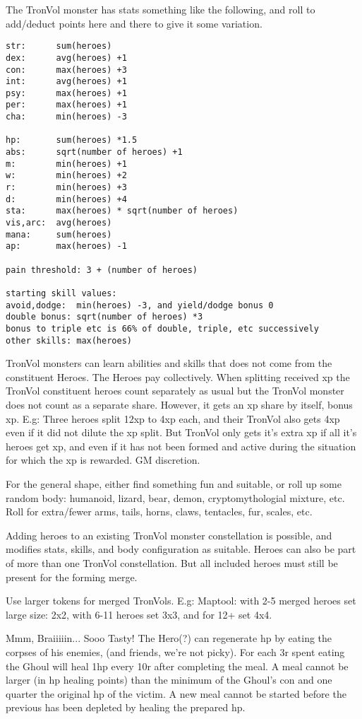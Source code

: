 The TronVol monster has stats something like the following, and roll to add/deduct points here and there to give it some variation.
\small\begin{verbatim}
str:      sum(heroes)
dex:      avg(heroes) +1
con:      max(heroes) +3
int:      avg(heroes) +1
psy:      max(heroes) +1
per:      max(heroes) +1
cha:      min(heroes) -3

hp:       sum(heroes) *1.5
abs:      sqrt(number of heroes) +1
m:        min(heroes) +1
w:        min(heroes) +2
r:        min(heroes) +3
d:        min(heroes) +4
sta:      max(heroes) * sqrt(number of heroes)
vis,arc:  avg(heroes)
mana:     sum(heroes)
ap:       max(heroes) -1

pain threshold: 3 + (number of heroes)

starting skill values:
avoid,dodge:  min(heroes) -3, and yield/dodge bonus 0
double bonus: sqrt(number of heroes) *3
bonus to triple etc is 66% of double, triple, etc successively
other skills: max(heroes)
\end{verbatim}\normalsize

TronVol monsters can learn abilities and skills that does not come from the constituent Heroes. The Heroes pay collectively. When splitting received xp the TronVol constituent heroes count separately as usual but the TronVol monster does not count as a separate share. However, it gets an xp share by itself, bonus xp. E.g: Three heroes split 12xp to 4xp each, and their TronVol also gets 4xp even if it did not dilute the xp split. But TronVol only gets it's extra xp if all it's heroes get xp, and even if it has not been formed and active during the situation for which the xp is rewarded. GM discretion.

For the general shape, either find something fun and suitable, or roll up some random body: humanoid, lizard, bear, demon, cryptomythologial mixture, etc. Roll for extra/fewer arms, tails, horns, claws, tentacles, fur, scales, etc.

Adding heroes to an existing TronVol monster constellation is possible, and modifies stats, skills, and body configuration as suitable. Heroes can also be part of more than one TronVol constellation. But all included heroes must still be present for the forming merge.

Use larger tokens for merged TronVols. E.g: Maptool: with 2-5 merged heroes set large size: 2x2, with 6-11 heroes set 3x3, and for 12+ set 4x4.


 Mmm, Braiiiiin... Sooo Tasty!
The Hero(?) can regenerate hp by eating the corpses of his enemies, (and friends, we're not picky). For each 3r spent eating the Ghoul will heal 1hp every 10r after completing the meal. A meal cannot be larger (in hp healing points) than the minimum of the Ghoul's con and one quarter the original hp of the victim. A new meal cannot be started before the previous has been depleted by healing the prepared hp.

